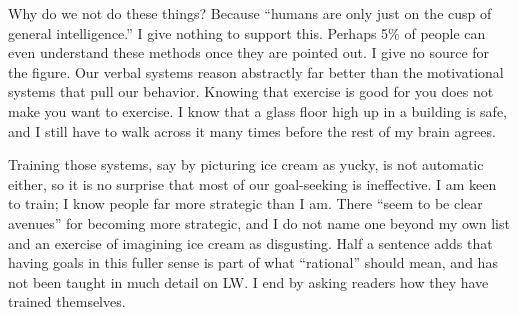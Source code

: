 Why do we not do these things? Because ``humans are only just on the cusp of general intelligence.'' I give nothing to support this.  Perhaps 5\% of people can even understand these methods once they are pointed out. I give no source for the figure. Our verbal systems reason abstractly far better than the motivational systems that pull our behavior. Knowing that exercise is good for you does not make you want to exercise. I know that a glass floor high up in a building is safe, and I still have to walk across it many times before the rest of my brain agrees.

Training those systems, say by picturing ice cream as yucky, is not automatic either, so it is no surprise that most of our goal-seeking is ineffective. I am keen to train; I know people far more strategic than I am. There ``seem to be clear avenues'' for becoming more strategic, and I do not name one beyond my own list and an exercise of imagining ice cream as disgusting. Half a sentence adds that having goals in this fuller sense is part of what ``rational'' should mean, and has not been taught in much detail on LW. I end by asking readers how they have trained themselves.

